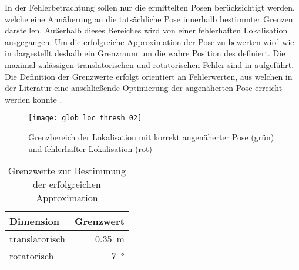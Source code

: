 

In der Fehlerbetrachtung sollen nur die ermittelten Posen berücksichtigt werden, welche eine Annäherung an die tatsächliche Pose innerhalb bestimmter Grenzen darstellen. Außerhalb dieses Bereiches wird von einer fehlerhaften Lokalisation ausgegangen. Um die erfolgreiche Approximation der Pose zu bewerten wird wie in  dargestellt deshalb ein Grenzraum um die wahre Position des  definiert. Die maximal zulässigen translatorischen und rotatorischen Fehler sind in  aufgeführt. Die Definition der Grenzwerte erfolgt orientiert an Fehlerwerten, aus welchen in der Literatur eine anschließende Optimierung der angenäherten Pose erreicht werden konnte \cite{Forster2013}.\\

\begin{figure}[!ht]
	\begin{center}
		\texttt{[image: glob\_loc\_thresh\_02]}
		\caption{Grenzbereich der Lokalisation mit korrekt angenäherter Pose (grün) und fehlerhafter Lokalisation (rot)}
		\label{fig.loclimits}
	\end{center}
\end{figure}

\begin{table}[ht]
	\centering
	\caption{Grenzwerte zur Bestimmung der erfolgreichen Approximation}
	\label{tab.thresh_glob}
	\vspace*{-3mm}
	\begin{tabular}[ht]{|l|r|}\hline
		\rowcolor{Snow2}
		Dimension		& Grenzwert 					\\ \hline
		translatorisch  	& \SI{0,35}{\meter}			\\ \hline
		rotatorisch		& \SI{7}{°}					\\ \hline
	\end{tabular} 
\end{table}

